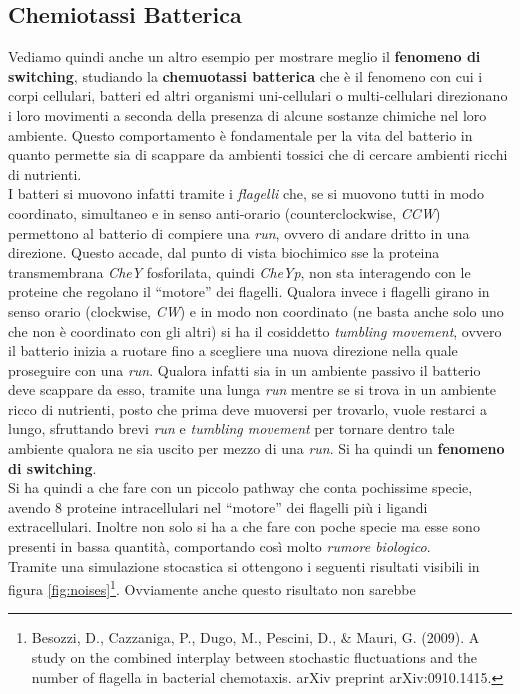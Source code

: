 \documentclass[a4paper,12pt, oneside]{book}
\begin{document}
\subsection{Chemiotassi Batterica}
Vediamo quindi anche un altro esempio per mostrare meglio il \textbf{fenomeno di
  switching}, studiando la \textbf{chemuotassi batterica} che è il fenomeno con
cui i corpi cellulari, batteri ed altri organismi uni-cellulari o
multi-cellulari direzionano i loro movimenti a seconda della presenza di alcune
sostanze chimiche nel loro ambiente. Questo comportamento è fondamentale per la
vita del batterio in quanto permette sia di scappare da ambienti tossici che di
cercare ambienti ricchi di nutrienti. \\
I batteri si muovono infatti tramite i \textit{flagelli} che, se si muovono
tutti in modo coordinato, simultaneo e in senso anti-orario (counterclockwise,
\textit{CCW}) permettono al 
batterio di compiere una \textit{run}, ovvero di andare dritto in una
direzione. Questo accade, dal punto di vista biochimico sse la proteina
transmembrana \textit{CheY} fosforilata, quindi \textit{CheYp}, non sta
interagendo con le 
proteine che regolano il ``motore'' dei flagelli. Qualora invece i flagelli
girano in senso orario (clockwise, \textit{CW}) e in modo 
non coordinato (ne basta anche solo uno che non è coordinato con gli altri) si
ha il cosiddetto \textit{tumbling movement}, ovvero il 
batterio inizia a ruotare fino a scegliere una nuova direzione nella quale
proseguire con una \textit{run}. Qualora infatti sia in un ambiente
passivo il batterio deve scappare da esso, tramite una lunga \textit{run} mentre
se si trova in un ambiente ricco di nutrienti, posto che prima deve muoversi per
trovarlo, vuole restarci a lungo, sfruttando brevi \textit{run} e
\textit{tumbling movement} per tornare dentro tale ambiente qualora ne sia
uscito per mezzo di una \textit{run}. Si ha quindi un \textbf{fenomeno di
  switching}.\\ 
Si ha quindi a che fare con un piccolo pathway che conta pochissime specie,
avendo 8 proteine intracellulari nel ``motore'' dei flagelli più i ligandi
extracellulari. Inoltre non solo si ha a che fare con poche specie ma esse sono
presenti in bassa quantità, comportando così molto \textit{rumore biologico}. \\
Tramite una simulazione stocastica si ottengono i seguenti risultati visibili in
figura \ref{fig:noises}\footnote{Besozzi, D., Cazzaniga, P., Dugo, M., Pescini,
  D., \& Mauri, G. (2009). A study on the combined interplay between stochastic
  fluctuations and the number of flagella in bacterial chemotaxis. arXiv
  preprint arXiv:0910.1415.}. Ovviamente anche questo risultato non sarebbe 
\end{document}
